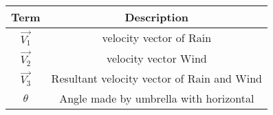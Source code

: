 \begin{tabular}[12ptx]{ |c| c|}
\hline\textbf{Term} & \textbf{Description}\\
\hline
$\vec{V_{1}}$ & velocity vector of Rain\\
\hline
$\vec{V_{2}}$ & velocity vector Wind\\
\hline
$\vec{V_{3}}$ & Resultant velocity vector of Rain and Wind\\
\hline
$\theta$ & Angle made by umbrella with horizontal\\
\hline
\end{tabular}



